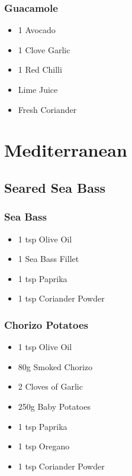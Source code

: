 \documentclass[11pt, english]{article}
\begin{document}
		\subsubsection*{Guacamole}

	\begin{itemize}
        \setlength\itemsep{0cm}
                \item 1 Avocado
		\item 1 Clove Garlic
		\item 1 Red Chilli
		\item Lime Juice
		\item Fresh Coriander
        \end{itemize}

\newpage

\section{Mediterranean}

	\subsection{Seared Sea Bass}

		\subsubsection*{Sea Bass}

	\begin{itemize}
        \setlength\itemsep{0cm}
                \item 1 tsp Olive Oil
		\item 1 Sea Bass Fillet
		\item 1 tsp Paprika
		\item 1 tsp Coriander Powder
        \end{itemize}

		\subsubsection*{Chorizo Potatoes}

	\begin{itemize}
        \setlength\itemsep{0cm}
                \item 1 tsp Olive Oil
		\item 80g Smoked Chorizo
		\item 2 Cloves of Garlic
		\item 250g Baby Potatoes
		\item 1 tsp Paprika
		\item 1 tsp Oregano
		\item 1 tsp Coriander Powder
        \end{itemize}
\end{document}
